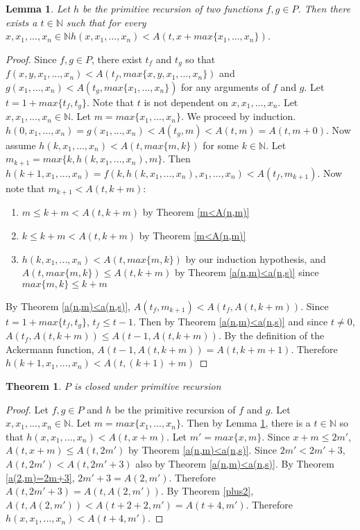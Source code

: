 \documentclass[12pt, letterpaper]{article}
\newtheorem{theorem}{Theorem}
\newtheorem{lemma}{Lemma}
\theoremstyle{case}
\begin{document}
    \begin{lemma}
      \label{recursionlemma}
      Let $h$ be the primitive recursion of two functions $f, g \in P$.
      Then there exists a $t \in \mathbb{N}$ such that
      for every $x, x_1, ..., x_n \in \mathbb{N}
      h(x, x_1, ..., x_n) < A(t, x + max\{x_1, ..., x_n\})$.
    \end{lemma}
    \begin{proof}
      Since $f, g \in P$, there exist $t_f$ and $t_g$ so that 
      $f(x, y, x_1, ..., x_n) < A(t_f, max\{x, y, x_1, ..., x_n\})$ and
      $g(x_1, ..., x_n) < A(t_g, max\{x_1, ..., x_n\})$ for any arguments of $f$ and $g$.
      Let $t = 1 + max\{t_f, t_g\}$. Note that $t$ is not dependent on $x, x_1, ..., x_n$.
      Let $x, x_1, ..., x_n \in \mathbb{N}$.
      Let $m = max\{x_1, ..., x_n\}$.
      We proceed by induction.
      $h(0, x_1, ..., x_n) = g(x_1, ..., x_n) < A(t_g, m) < A(t, m) = A(t, m + 0)$.
      Now assume $h(k, x_1, ..., x_n) < A(t, max\{m, k\})$ for some $k \in \mathbb{N}$.
      Let $m_{k+1} = max\{k, h(k, x_1, ..., x_n), m\}$.
      Then $h(k + 1, x_1, ..., x_n) = f(k, h(k, x_1, ..., x_n), x_1, ..., x_n) < A(t_f, m_{k+1})$.
      Now note that $m_{k+1} < A(t, k + m)$:
      \begin{enumerate}
        \item $m \leq k + m < A(t, k + m)$ by Theorem \ref{m<A(n,m)}
        \item $k \leq k + m < A(t, k + m)$ by Theorem \ref{m<A(n,m)}
        \item $h(k, x_1, ..., x_n) < A(t, max\{m, k\})$ by our induction hypothesis, and $A(t, max\{m, k\}) \leq
        A(t, k + m)$ by Theorem \ref{a(n,m)<a(n,s)} since $max\{m, k\} \leq k + m$
      \end{enumerate}
      By Theorem \ref{a(n,m)<a(n,s)}, $A(t_f, m_{k+1}) < A(t_f, A(t, k + m))$.
      Since $t = 1 + max\{t_f, t_g\}$, $t_f \leq t - 1$.
      Then by Theorem \ref{a(n,m)<a(n,s)} and since $t \neq 0$, $A(t_f, A(t, k + m)) \leq A(t - 1, A(t, k + m))$.
      By the definition of the Ackermann function, $A(t - 1, A(t, k + m)) = A(t, k + m + 1)$.
      Therefore $h(k + 1, x_1, ..., x_n) < A(t, (k + 1) + m)$
    \end{proof}

    \begin{theorem}
      $P$ is closed under primitive recursion
    \end{theorem}
    \begin{proof}
      Let $f, g \in P$ and $h$ be the primitive recursion of $f$ and $g$.
      Let $x, x_1, ..., x_n \in \mathbb{N}$.
      Let $m = max\{x_1, ..., x_n\}$.
      Then by Lemma \ref{recursionlemma}, there is a $t \in \mathbb{N}$ so that
      $h(x, x_1, ..., x_n) < A(t, x + m)$.
      Let $m' = max\{x, m\}$.
      Since $x + m \leq 2m'$, $A(t, x + m) \leq A(t, 2m')$ by Theorem \ref{a(n,m)<a(n,s)}.
      Since $2m' < 2m' + 3$, $A(t, 2m') < A(t, 2m' + 3)$ also by Theorem \ref{a(n,m)<a(n,s)}.
      By Theorem \ref{a(2,m)=2m+3}, $2m' + 3 = A(2, m')$.
      Therefore $A(t, 2m' + 3) = A(t, A(2, m'))$.
      By Theorem \ref{plus2}, $A(t, A(2, m')) < A(t + 2 + 2, m') = A(t + 4, m')$.
      Therefore $h(x, x_1, ..., x_n) < A(t + 4, m')$.
    \end{proof}
\end{document}
